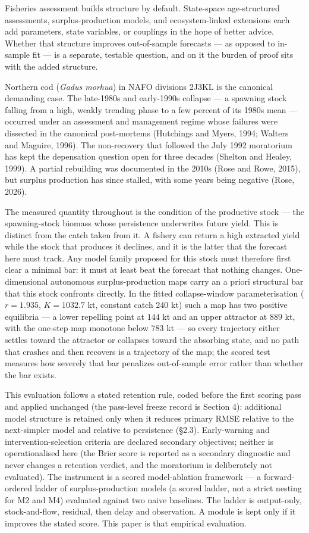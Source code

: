 \documentclass[11pt]{article}
\begin{document}
Fisheries assessment builds structure by default. State-space
age-structured assessments, surplus-production models, and
ecosystem-linked extensions each add parameters, state variables, or
couplings in the hope of better advice. Whether that structure improves
out-of-sample forecasts --- as opposed to in-sample fit --- is a
separate, testable question, and on it the burden of proof sits with the
added structure.

Northern cod (\emph{Gadus morhua}) in NAFO divisions 2J3KL is the
canonical demanding case. The late-1980s and early-1990s collapse --- a
spawning stock falling from a high, weakly trending phase to a few
percent of its 1980s mean --- occurred under an assessment and
management regime whose failures were dissected in the canonical
post-mortems (Hutchings and Myers, 1994; Walters and Maguire, 1996). The
non-recovery that followed the July 1992 moratorium has kept the
depensation question open for three decades (Shelton and Healey, 1999).
A partial rebuilding was documented in the 2010s (Rose and Rowe, 2015),
but surplus production has since stalled, with some years being negative
(Rose, 2026).

The measured quantity throughout is the condition of the productive
stock --- the spawning-stock biomass whose persistence underwrites
future yield. This is distinct from the catch taken from it. A fishery
can return a high extracted yield while the stock that produces it
declines, and it is the latter that the forecast here must track. Any
model family proposed for this stock must therefore first clear a
minimal bar: it must at least beat the forecast that nothing changes.
One-dimensional autonomous surplus-production maps carry an a priori
structural bar that this stock confronts directly. In the fitted
collapse-window parameterisation (\(r = 1.935\), \(K = 1032.7\) kt,
constant catch \(240\) kt) such a map has two positive equilibria --- a
lower repelling point at \(144\) kt and an upper attractor at \(889\)
kt, with the one-step map monotone below \(783\) kt --- so every
trajectory either settles toward the attractor or collapses toward the
absorbing state, and no path that crashes and then recovers is a
trajectory of the map; the scored test measures how severely that bar
penalizes out-of-sample error rather than whether the bar exists.

This evaluation follows a stated retention rule, coded before the first
scoring pass and applied unchanged (the pass-level freeze record is
Section 4): additional model structure is retained only when it reduces
primary RMSE relative to the next-simpler model and relative to
persistence (\S{}2.3). Early-warning and intervention-selection criteria
are declared secondary objectives; neither is operationalised here (the
Brier score is reported as a secondary diagnostic and never changes a
retention verdict, and the moratorium is deliberately not evaluated).
The instrument is a scored model-ablation framework --- a
forward-ordered ladder of surplus-production models (a scored ladder,
not a strict nesting for M2 and M4) evaluated against two naive
baselines. The ladder is output-only, stock-and-flow, residual, then
delay and observation. A module is kept only if it improves the stated
score. This paper is that empirical evaluation.
\end{document}
